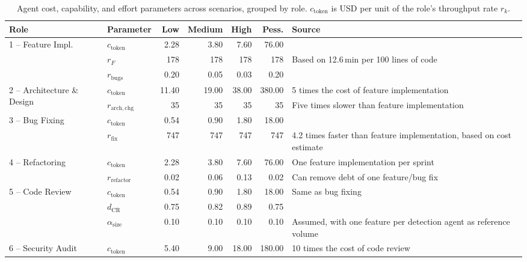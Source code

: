 \documentclass[smallextended]{svjour3}       %
\begin{document}
\begin{table}[t]
\caption{Agent cost, capability, and effort parameters across scenarios, grouped by role. $c_\mathrm{token}$ is USD per unit of the role's throughput rate $r_k$.}
\label{tab:scenario:agents}
\footnotesize
\setlength{\tabcolsep}{3pt}
\begin{tabularx}{\linewidth}{p{2.2cm}p{1.5cm}rrrrX}
\toprule
Role & Parameter & Low & Medium & High & Pess. & Source \\
\midrule
\multirow{3}{2.2cm}{1 -- Feature Impl.}
  & $c_\mathrm{token}$     & 2.28 & 3.80 & 7.60 & 76.00 & \cite{morph2026aicodingcosts} \\
  & $r_F$                  & 178  & 178  & 178  & 178   & Based on 12.6\,min per 100 lines of code~\citep{baumann2026swechat,scaleSWEBenchPublic} \\
  & $r_\mathrm{bugs}$      & 0.20 & 0.05 & 0.03 & 0.20  & \cite{valsai2026swebench} \\
\midrule
\multirow{2}{2.2cm}{2 -- Architecture \& Design}
  & $c_\mathrm{token}$     & 11.40 & 19.00 & 38.00 & 380.00 & 5 times the cost of feature implementation \\
  & $r_\mathrm{arch,chg}$  & 35    & 35    & 35    & 35     & Five times slower than feature implementation \\
\midrule
\multirow{2}{2.2cm}{3 -- Bug Fixing}
  & $c_\mathrm{token}$     & 0.54 & 0.90 & 1.80 & 18.00 & \cite{morph2026aicodingcosts} \\
  & $r_\mathrm{fix}$       & 747  & 747  & 747  & 747   & 4.2 times faster than feature implementation, based on cost estimate \\
\midrule
\multirow{2}{2.2cm}{4 -- Refactoring}
  & $c_\mathrm{token}$     & 2.28 & 3.80 & 7.60 & 76.00 & One feature implementation per sprint \\
  & $r_\mathrm{refactor}$  & 0.02 & 0.06 & 0.13 & 0.02  & Can remove debt of one feature/bug fix \\
\midrule
\multirow{3}{2.2cm}{5 -- Code Review}
  & $c_\mathrm{token}$     & 0.54 & 0.90 & 1.80 & 18.00 & Same as bug fixing \\
  & $d_\mathrm{CR}$        & 0.75 & 0.82 & 0.89 & 0.75  & \cite{wang2026swe} \\
  & $\alpha_\mathrm{size}$ & 0.10 & 0.10 & 0.10 & 0.10  & Assumed, with one feature per detection agent as reference volume \\
\midrule
\multirow{2}{2.2cm}{6 -- Security Audit}
  & $c_\mathrm{token}$     & 5.40 & 9.00 & 18.00 & 180.00 & 10 times the cost of code review \\

\end{tabularx}
\end{table}
\end{document}
